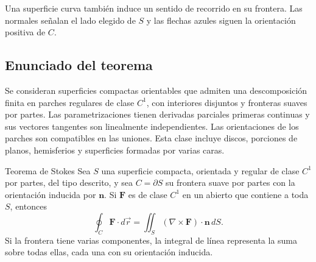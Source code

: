 \begin{center}
\begin{minipage}{.94\textwidth}
\centering
\begingroup\shorthandoff{>}
\endgroup
\end{minipage}
\end{center}

Una superficie curva también induce un sentido de recorrido en su frontera. Las normales señalan el lado elegido de $S$ y las flechas azules siguen la orientación positiva de $C$.

\subsection{Enunciado del teorema}

Se consideran superficies compactas orientables que admiten una descomposición finita en parches regulares de clase $C^1$, con interiores disjuntos y fronteras suaves por partes. Las parametrizaciones tienen derivadas parciales primeras continuas y sus vectores tangentes son linealmente independientes. Las orientaciones de los parches son compatibles en las uniones. Esta clase incluye discos, porciones de planos, hemisferios y superficies formadas por varias caras.

\begin{mytheorem}{Teorema de Stokes}
Sea $S$ una superficie compacta, orientada y regular de clase $C^1$ por partes, del tipo descrito, y sea $C=\partial S$ su frontera suave por partes con la orientación inducida por $\mathbf n$. Si $\mathbf F$ es de clase $C^1$ en un abierto que contiene a toda $S$, entonces
\[
\oint_C\mathbf F\cdot d\vec r
=\iint_S(\nabla\times\mathbf F)\cdot\mathbf n\,dS.
\]
Si la frontera tiene varias componentes, la integral de línea representa la suma sobre todas ellas, cada una con su orientación inducida.
\end{mytheorem}

